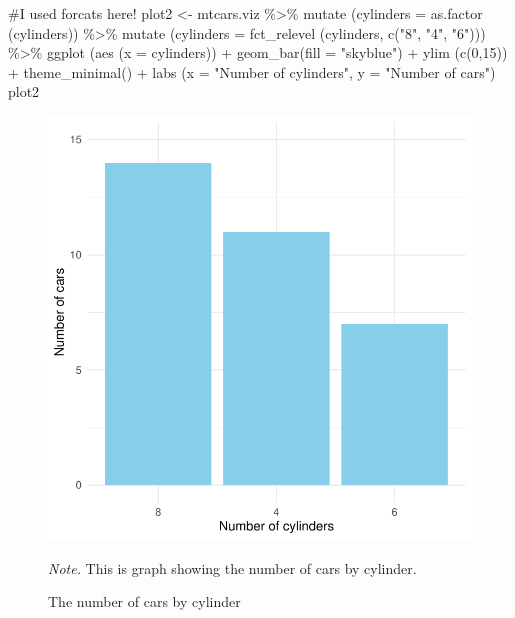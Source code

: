 \documentclass[
  man,
  floatsintext,
  longtable,
  nolmodern,
  notxfonts,
  notimes,
  colorlinks=true,linkcolor=blue,citecolor=blue,urlcolor=blue]{apa7}
\newenvironment{Shaded}{\begin{snugshade}}{\end{snugshade}}
\newcommand{\AttributeTok}[1]{\textcolor[rgb]{0.40,0.45,0.13}{#1}}
\newcommand{\CommentTok}[1]{\textcolor[rgb]{0.37,0.37,0.37}{#1}}
\newcommand{\DecValTok}[1]{\textcolor[rgb]{0.68,0.00,0.00}{#1}}
\newcommand{\FunctionTok}[1]{\textcolor[rgb]{0.28,0.35,0.67}{#1}}
\newcommand{\NormalTok}[1]{\textcolor[rgb]{0.00,0.23,0.31}{#1}}
\newcommand{\OtherTok}[1]{\textcolor[rgb]{0.00,0.23,0.31}{#1}}
\newcommand{\SpecialCharTok}[1]{\textcolor[rgb]{0.37,0.37,0.37}{#1}}
\newcommand{\StringTok}[1]{\textcolor[rgb]{0.13,0.47,0.30}{#1}}
\begin{document}
\begin{Shaded}
\begin{Highlighting}[]
\CommentTok{\#I used forcats here!}
\NormalTok{plot2 }\OtherTok{\textless{}{-}}\NormalTok{ mtcars.viz }\SpecialCharTok{\%\textgreater{}\%} 
  \FunctionTok{mutate}\NormalTok{ (}\AttributeTok{cylinders =} \FunctionTok{as.factor}\NormalTok{ (cylinders)) }\SpecialCharTok{\%\textgreater{}\%}
  \FunctionTok{mutate}\NormalTok{ (}\AttributeTok{cylinders =} \FunctionTok{fct\_relevel}\NormalTok{ (cylinders, }\FunctionTok{c}\NormalTok{(}\StringTok{"8"}\NormalTok{, }\StringTok{"4"}\NormalTok{, }\StringTok{"6"}\NormalTok{))) }\SpecialCharTok{\%\textgreater{}\%}
  \FunctionTok{ggplot}\NormalTok{ (}\FunctionTok{aes}\NormalTok{ (}\AttributeTok{x =}\NormalTok{ cylinders)) }\SpecialCharTok{+}
  \FunctionTok{geom\_bar}\NormalTok{(}\AttributeTok{fill =} \StringTok{"skyblue"}\NormalTok{) }\SpecialCharTok{+}
  \FunctionTok{ylim}\NormalTok{ (}\FunctionTok{c}\NormalTok{(}\DecValTok{0}\NormalTok{,}\DecValTok{15}\NormalTok{)) }\SpecialCharTok{+}
  \FunctionTok{theme\_minimal}\NormalTok{() }\SpecialCharTok{+}
  \FunctionTok{labs}\NormalTok{ (}\AttributeTok{x =} \StringTok{"Number of cylinders"}\NormalTok{, }\AttributeTok{y =} \StringTok{"Number of cars"}\NormalTok{)}
\NormalTok{plot2}
\end{Highlighting}
\end{Shaded}

\begin{figure}[H]

{\caption{{The number of cars by cylinder}{\label{fig-plot2-barplot}}}}

\includegraphics{data-visualization_files/figure-pdf/fig-plot2-barplot-1.pdf}

{\noindent \emph{Note.} This is graph showing the number of cars by
cylinder.}

\end{figure}
\end{document}
